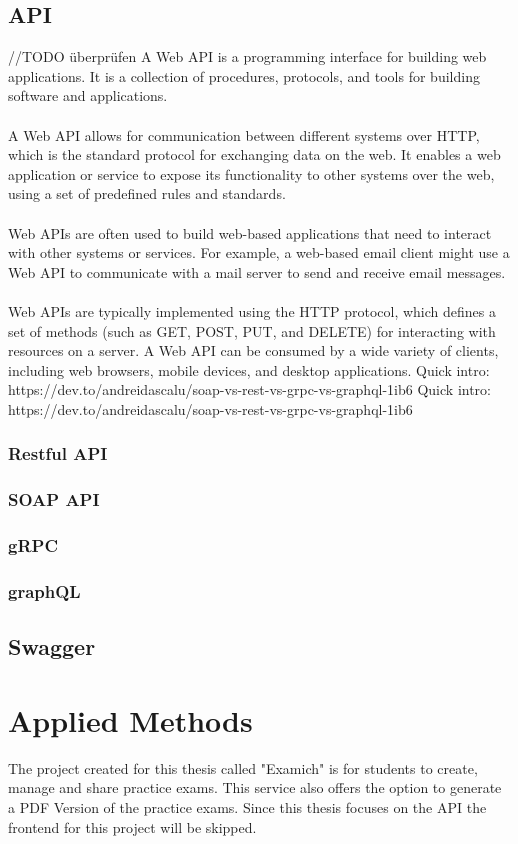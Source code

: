 \documentclass[BIF,Master,nenglish]{twbook}%
\begin{document}
\section{API}
//TODO überprüfen
A Web API is a programming interface for building web applications. It is a collection of procedures, protocols, and tools for building software and applications.
\\
\\
A Web API allows for communication between different systems over HTTP, which is the standard protocol for exchanging data on the web. It enables a web application or service to expose its functionality to other systems over the web, using a set of predefined rules and standards.
\\
\\
Web APIs are often used to build web-based applications that need to interact with other systems or services. For example, a web-based email client might use a Web API to communicate with a mail server to send and receive email messages.
\\
\\
Web APIs are typically implemented using the HTTP protocol, which defines a set of methods (such as GET, POST, PUT, and DELETE) for interacting with resources on a server. A Web API can be consumed by a wide variety of clients, including web browsers, mobile devices, and desktop applications.
Quick intro:
https://dev.to/andreidascalu/soap-vs-rest-vs-grpc-vs-graphql-1ib6
Quick intro:
https://dev.to/andreidascalu/soap-vs-rest-vs-grpc-vs-graphql-1ib6
\subsection{Restful API}
\subsection{SOAP API}
\subsection{gRPC}
\subsection{graphQL}

\section{Swagger}


\clearpage
\chapter{Applied Methods}
The project created for this thesis called "Examich" is for students to create, manage and share practice exams. This service also offers the option to generate a PDF Version of the practice exams. Since this thesis focuses on the API the frontend for this project will be skipped.
\end{document}
